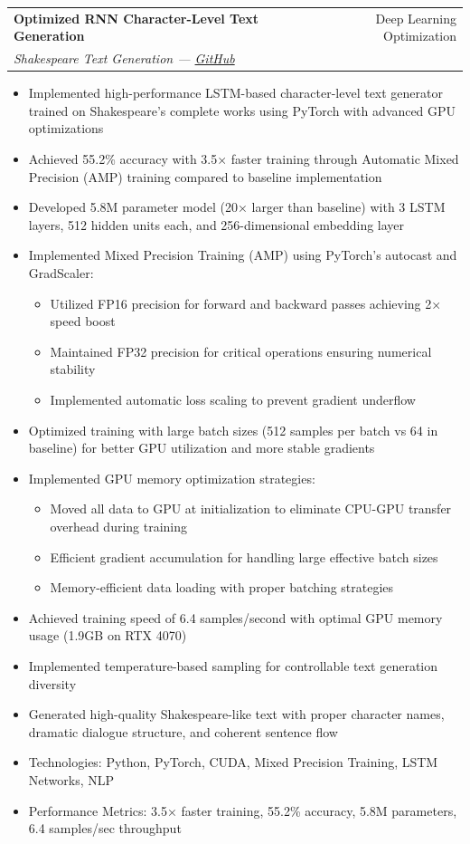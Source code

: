 \documentclass[a4paper,12pt]{article}
\makeatletter
\newenvironment{projectdetailed}[3]
    {
    \begin{tabularx}{\linewidth}{@{}l X r@{}}
    \textbf{#1} & \hfill & #2 \\
    \textit{#3} & & \\[3.75pt]
    \end{tabularx}
    \begin{minipage}[t]{\linewidth}
    \begin{itemize}[nosep,after=\strut, leftmargin=1em, itemsep=2pt,label=--]
    }
    {
    \end{itemize}
    \end{minipage}
    \vspace{6pt}
    }
\makeatother
\begin{document}
\begin{projectdetailed}{Optimized RNN Character-Level Text Generation}{Deep Learning Optimization}{Shakespeare Text Generation — \href{https://github.com/Umer-Farooq-CS/RNN-Character-Level-Text-Generation}{GitHub}}
\item Implemented high-performance LSTM-based character-level text generator trained on Shakespeare's complete works using PyTorch with advanced GPU optimizations
\item Achieved 55.2\% accuracy with 3.5× faster training through Automatic Mixed Precision (AMP) training compared to baseline implementation
\item Developed 5.8M parameter model (20× larger than baseline) with 3 LSTM layers, 512 hidden units each, and 256-dimensional embedding layer
\item Implemented Mixed Precision Training (AMP) using PyTorch's autocast and GradScaler:
\begin{itemize}[nosep, leftmargin=2em]
    \item Utilized FP16 precision for forward and backward passes achieving 2× speed boost
    \item Maintained FP32 precision for critical operations ensuring numerical stability
    \item Implemented automatic loss scaling to prevent gradient underflow
\end{itemize}
\item Optimized training with large batch sizes (512 samples per batch vs 64 in baseline) for better GPU utilization and more stable gradients
\item Implemented GPU memory optimization strategies:
\begin{itemize}[nosep, leftmargin=2em]
    \item Moved all data to GPU at initialization to eliminate CPU-GPU transfer overhead during training
    \item Efficient gradient accumulation for handling large effective batch sizes
    \item Memory-efficient data loading with proper batching strategies
\end{itemize}
\item Achieved training speed of 6.4 samples/second with optimal GPU memory usage (1.9GB on RTX 4070)
\item Implemented temperature-based sampling for controllable text generation diversity
\item Generated high-quality Shakespeare-like text with proper character names, dramatic dialogue structure, and coherent sentence flow
\item Technologies: Python, PyTorch, CUDA, Mixed Precision Training, LSTM Networks, NLP
\item Performance Metrics: 3.5× faster training, 55.2\% accuracy, 5.8M parameters, 6.4 samples/sec throughput
\end{projectdetailed}
\end{document}
